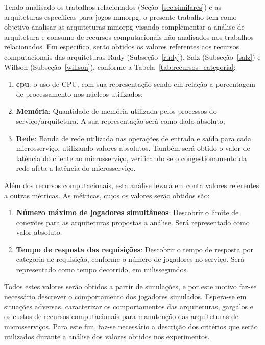 Tendo analisado os trabalhos relacionados (Seção~\ref{sec:similares}) e as arquiteturas específicas para jogos \ac{mmorpg}, o presente trabalho tem como objetivo analisar as arquiteturas \ac{mmorpg} visando complementar a análise de arquitetura e consumo de recursos computacionais não analisados nos trabalhos relacionados.
%
Em específico, serão obtidos os valores referentes aos recursos computacionais das arquiteturas Rudy (Subseção~\ref{rudy}), Salz (Subseção~\ref{salz}) e Willson (Subseção~\ref{willson}), conforme a Tabela~\ref{tab:recursos_categoria}:

\begin{enumerate}
  \item \textbf{\ac{cpu}}: o uso de CPU, com sua representação sendo em relação a porcentagem de processamento nos núcleos utilizados;
  \item \textbf{Memória}: Quantidade de memória utilizada pelos processos do serviço/arquitetura. A sua representação será como dado absoluto;
  \item \textbf{Rede}: Banda de rede utilizada nas operações de entrada e saída para cada microsserviço, utilizando valores absolutos. Também será obtido o valor de latência do cliente ao microsserviço, verificando se o congestionamento da rede afeta a latência do microsserviço.
\end{enumerate}

Além dos recursos computacionais, esta análise levará em conta valores referentes a outras métricas.
%
As métricas, cujos os valores serão obtidos são:

\begin{enumerate}
  \item \textbf{Número máximo de jogadores simultâneos}: Descobrir o limite de conexões para as arquiteturas propostas a análise. Será representado como valor absoluto.
  \item \textbf{Tempo de resposta das requisições}: Descobrir o tempo de resposta por categoria de requisição, conforme o número de jogadores no serviço. Será representado como tempo decorrido, em milissegundos.
\end{enumerate}

Todos estes valores serão obtidos a partir de simulações, e por este motivo faz-se necessário descrever o comportamento dos jogadores simulados.
%
Espera-se em situações adversas, caracterizar os comportamentos das arquiteturas, gargalos e os custos de recursos computacionais para manutenção das arquiteturas de microsserviços.
%
Para este fim, faz-se necessário a descrição dos critérios que serão utilizados durante a análise dos valores obtidos nos experimentos.

